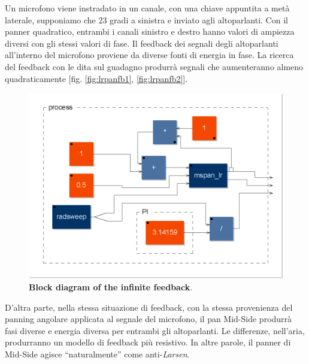 Un microfono viene instradato in un canale, con una chiave appuntita a metà
laterale, supponiamo che 23 gradi a sinistra e inviato agli altoparlanti. Con il
panner quadratico, entrambi i canali sinistro e destro hanno valori di ampiezza
diversi con gli stessi valori di fase. Il feedback dei segnali degli
altoparlanti all'interno del microfono proviene da diverse fonti di energia in
fase. La ricerca del feedback con le dita sul guadagno produrrà segnali che
aumenteranno almeno quadraticamente [fig. \ref{fig:lrpanfb1}, \ref{fig:lrpanfb2}].

\begin{figure}[h]
\centering
\includegraphics[width=1\columnwidth]{CAPITOLI/1000/IMG/mspanlrfb_diagram}
\caption{\textbf{Block diagram of the infinite feedback}.}
\label{fig:mspan}
\end{figure}

D'altra parte, nella stessa situazione di feedback, con la stessa provenienza
del panning angolare applicata al segnale del microfono, il pan Mid-Side
produrrà fasi diverse e energia diversa per entrambi gli altoparlanti. Le
differenze, nell'aria, produrranno un modello di feedback più resistivo. In
altre parole, il panner di Mid-Side agisce “naturalmente” come anti-\emph{Larsen}.


